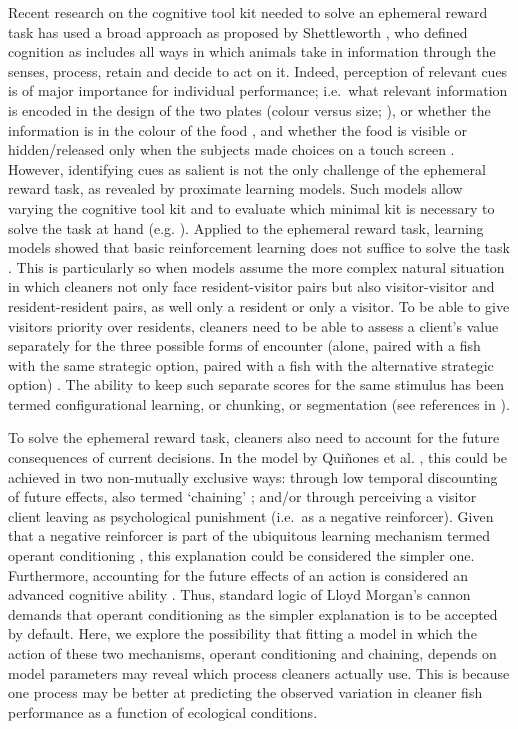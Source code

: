 \documentclass[]{rsos}%
\begin{document}
Recent research on the cognitive tool kit needed to solve an ephemeral
reward task has used a broad approach as proposed by Shettleworth
\citep{shettleworth_Cognition_2009},
who defined cognition as includes all ways in which animals take in information
through the senses, process, retain and decide to act on it. Indeed, perception
of relevant cues is of major importance for individual performance;
i.e.~what relevant information is encoded in the design of the two
plates (colour versus size; \citep{wismer_Cuebased_2019}), or whether
the information is in the colour of
the food \citep{pretot_Comparative_2021, pretot_Comparing_2016}, and
whether the food is visible or hidden/released only when the subjects
made choices on a touch screen \citep{pretot_Factors_2016}. However, identifying
cues as salient is not the only challenge of the ephemeral reward task,
as revealed by proximate learning models. Such models allow varying the
cognitive tool kit and to evaluate which minimal kit is necessary to solve
the task at hand (e.g. \citep{dubois_Model_2021}). Applied to the ephemeral
reward task, learning models showed that basic reinforcement learning does
not suffice to solve the task \citep{prat_Modelling_2022, quinones_Reinforcement_2019}.
This is particularly so when models assume the more complex natural
situation in which cleaners not only face resident-visitor pairs but also
visitor-visitor and resident-resident pairs, as well only a resident or
only a visitor. To be able to give visitors priority over residents,
cleaners need to be able to assess a client's value separately for the
three possible forms of encounter (alone, paired with a fish with the
same strategic option, paired with a fish with the alternative strategic option)
\citep{quinones_Reinforcement_2019}. The ability to keep such separate scores
for the same stimulus has been termed configurational learning,
or chunking, or segmentation (see references in \citep{prat_Modelling_2022}).

To solve the ephemeral reward task, cleaners also need to account for
the future consequences of current decisions. In the model by
Quiñones et al. \citep{quinones_Reinforcement_2019}, this could be achieved in
two non-mutually exclusive ways: through low temporal discounting of
future effects, also termed `chaining' \citep{enquist_Power_2016}; and/or
through perceiving a visitor client leaving as psychological punishment
(i.e.~as a negative reinforcer). Given that a negative reinforcer is part
of the ubiquitous learning mechanism termed operant conditioning
\citep{thorndike_Animal_1898, skinner_Behavior_1938}, this explanation
could be considered the simpler one. Furthermore, accounting for the
future effects of an action is considered an advanced cognitive
ability \citep{suddendorf_Evolution_2007}. Thus, standard logic of
Lloyd Morgan's cannon demands that operant conditioning as the simpler
explanation is to be accepted by default. Here, we explore the
possibility that fitting a model in which the action of these two
mechanisms, operant conditioning and chaining, depends
on model parameters may reveal which process cleaners actually use.
This is because one process may be better at predicting the observed
variation in cleaner fish performance as a function of ecological conditions.
\end{document}
